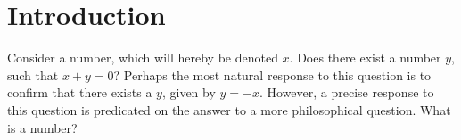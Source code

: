 \documentclass[../Dissertation.tex]{subfiles}
\begin{document}
\section{Introduction}
Consider a number, which will hereby be denoted $x$. Does there exist a number $y$, such that $x + y = 0$? Perhaps the most natural response to this question is to confirm that there exists a $y$, given by $y = -x$. However, a precise response to this question is predicated on the answer to a more philosophical question. What is a number?
\par
\end{document}
